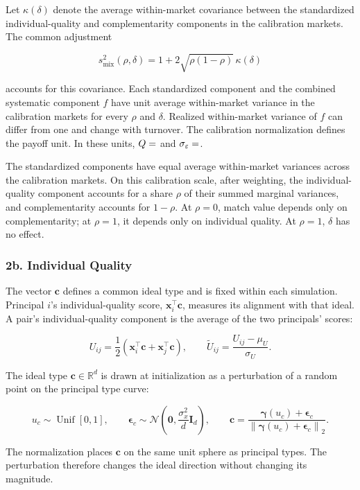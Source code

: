 \documentclass[11pt]{article}
\begin{document}
Let \(\kappa(\delta)\) denote the average within-market covariance between the standardized individual-quality and complementarity components in the calibration markets. The common adjustment

\[s_{\mathrm{mix}}^2(\rho,\delta)=1+2\sqrt{\rho(1-\rho)}\,\kappa(\delta)\]

accounts for this covariance. Each standardized component and the combined systematic component \(f\) have unit average within-market variance in the calibration markets for every \(\rho\) and \(\delta\). Realized within-market variance of \(f\) can differ from one and change with turnover. The calibration normalization defines the payoff unit. In these units, \(Q=\pv{settingQ}\) and \(\sigma_\varepsilon=\pv{settingsigma_eps}\).

The standardized components have equal average within-market variances across the calibration markets. On this calibration scale, after weighting, the individual-quality component accounts for a share \(\rho\) of their summed marginal variances, and complementarity accounts for \(1-\rho\). At \(\rho=0\), match value depends only on complementarity; at \(\rho=1\), it depends only on individual quality. At \(\rho=1\), \(\delta\) has no effect.

\subsubsection{2b. Individual Quality}\label{b.-agent-individual-quality}

The vector \(\mathbf{c}\) defines a common ideal type and is fixed within each simulation. Principal \(i\)'s individual-quality score, \(\mathbf{x}_i^\top\mathbf{c}\), measures its alignment with that ideal. A pair's individual-quality component is the average of the two principals' scores:

\[
U_{ij}=\frac{1}{2}(\mathbf{x}_i^\top\mathbf{c}+\mathbf{x}_j^\top\mathbf{c}),
\qquad
\widetilde U_{ij}=\frac{U_{ij}-\mu_U}{\sigma_U}.
\]

The ideal type \(\mathbf{c}\in\mathbb{R}^d\) is drawn at initialization as a perturbation of a random point on the principal type curve:

\[u_c\sim\operatorname{Unif}[0,1],\qquad
\boldsymbol{\epsilon}_c\sim\mathcal N\!\left(\mathbf 0,\frac{\sigma_x^2}{d}\mathbf I_d\right),\qquad
\mathbf c=\frac{\boldsymbol{\gamma}(u_c)+\boldsymbol{\epsilon}_c}
{\left\|\boldsymbol{\gamma}(u_c)+\boldsymbol{\epsilon}_c\right\|_2}.\]

The normalization places \(\mathbf c\) on the same unit sphere as principal types. The perturbation therefore changes the ideal direction without changing its magnitude.
\end{document}
